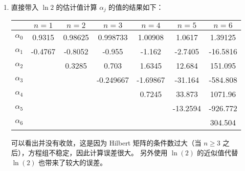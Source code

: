 \documentclass[lang=cn,a4paper,newtx,bibend=bibtex]{elegantpaper}
\begin{document}
\begin{enumerate}
\item 直接带入 $\ln 2$ 的估计值计算 $\alpha_j$ 的值的结果如下：

\begin{table}[h]
  \centering
  \begin{tabular}{|c|c|c|c|c|c|c|}
  \hline
   & $n = 1$ & $n = 2$ & $n = 3$ & $n = 4$ & $n = 5$ & $n = 6$ \\
  \hline
  $\alpha_0$ & 0.9315 & 0.98625 & 0.998733 & 1.00908 & 1.0617 & 1.39125 \\
  $\alpha_1$ & -0.4767 & -0.8052 & -0.955 & -1.162 & -2.7405 & -16.5816 \\
  $\alpha_2$ & & 0.3285 & 0.703 & 1.6345 & 12.684 & 151.095 \\
  $\alpha_3$ & & & -0.249667 & -1.69867 & -31.164 & -584.808 \\
  $\alpha_4$ & & & & 0.7245 & 33.873 & 1071.96 \\
  $\alpha_5$ & & & & & -13.2594 & -926.772 \\
  $\alpha_6$ & & & & & & 304.504 \\
  \hline
  \end{tabular}
  \end{table}

可以看出并没有收敛，这是因为 Hilbert 矩阵的条件数过大（当 $n\ge 3$ 之后），方程组不稳定，因此计算误差很大。
另外使用 $\ln(2)$ 的近似值代替 $\ln(2)$ 也带来了较大的误差。


\end{enumerate}
\end{document}

